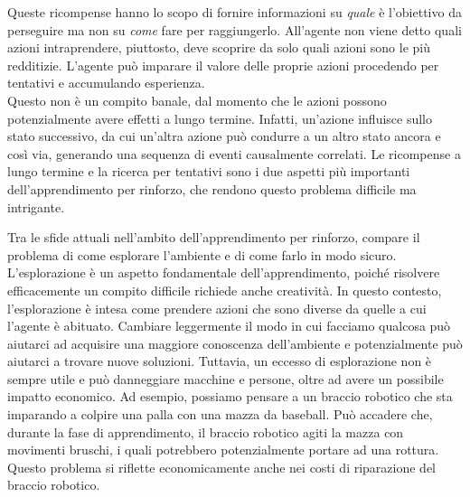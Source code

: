 Queste ricompense hanno lo scopo di fornire informazioni su \textit{quale} è l'obiettivo da perseguire ma non su \textit{come} fare per raggiungerlo. All'agente non viene detto quali azioni intraprendere, piuttosto, deve scoprire da solo quali azioni sono le più redditizie. 
L'agente può imparare il valore delle proprie azioni procedendo per tentativi e accumulando esperienza.\\
Questo non è un compito banale, dal momento che le azioni possono potenzialmente avere effetti a lungo termine. Infatti, un'azione influisce sullo stato successivo, da cui un'altra azione può condurre a un altro stato ancora e così via, generando una sequenza di eventi causalmente correlati. Le ricompense a lungo termine e la ricerca per tentativi sono i due aspetti più importanti dell'apprendimento per rinforzo, che rendono questo problema difficile ma intrigante.

Tra le sfide attuali nell'ambito dell'apprendimento per rinforzo, compare il problema di come esplorare l'ambiente e di come farlo in modo sicuro. L'esplorazione è un aspetto fondamentale dell'apprendimento, poiché risolvere efficacemente un compito difficile richiede anche creatività. In questo contesto, l'esplorazione è intesa come prendere azioni che sono diverse da quelle a cui l'agente è abituato. Cambiare leggermente il modo in cui facciamo qualcosa può aiutarci ad acquisire una maggiore conoscenza dell'ambiente e potenzialmente può aiutarci a trovare nuove soluzioni. Tuttavia, un eccesso di esplorazione non è sempre utile e può danneggiare macchine e persone, oltre ad avere un possibile impatto economico. Ad esempio, possiamo pensare a un braccio robotico che sta imparando a colpire una palla con una mazza da baseball. Può accadere che, durante la fase di apprendimento, il braccio robotico agiti la mazza con movimenti bruschi, i quali potrebbero potenzialmente portare ad una rottura. Questo problema si riflette economicamente anche nei costi di riparazione del braccio robotico.

